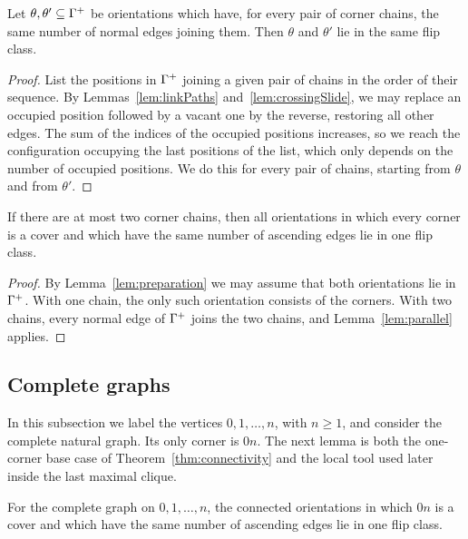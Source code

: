 \begin{lemma}\label{lem:parallel}
Let $\theta,\theta'\subseteq\Gamma^{+}$ be orientations which have, for every pair
of corner chains, the same number of normal edges joining them.
Then $\theta$ and $\theta'$ lie in the same flip class.
\end{lemma}

\begin{proof}
List the positions in $\Gamma^{+}$ joining a given pair of chains in the order of
their sequence.
By Lemmas~\ref{lem:linkPaths} and~\ref{lem:crossingSlide}, we may replace an occupied
position followed by a vacant one by the reverse, restoring all other edges.
The sum of the indices of the occupied positions increases, so we reach the
configuration occupying the last positions of the list, which only depends on
the number of occupied positions.
We do this for every pair of chains, starting from $\theta$ and from $\theta'$.
\end{proof}

\begin{lemma}\label{lem:twoChains}
If there are at most two corner chains, then all orientations in which every
corner is a cover and which have the same number of ascending edges lie in one
flip class.
\end{lemma}

\begin{proof}
By Lemma~\ref{lem:preparation} we may assume that both orientations lie in
$\Gamma^{+}$.
With one chain, the only such orientation consists of the corners.
With two chains, every normal edge of $\Gamma^{+}$ joins the two chains, and
Lemma~\ref{lem:parallel} applies.
\end{proof}

\subsection{Complete graphs}\label{subs:complete}

In this subsection we label the vertices $0,1,\dotsc,n$, with $n\geq1$, and
consider the complete natural graph.
Its only corner is $0n$.
The next lemma is both the one-corner base case of
Theorem~\ref{thm:connectivity} and the local tool used later inside the last
maximal clique.

\begin{lemma}\label{lem:complete}
For the complete graph on $0,1,\dotsc,n$, the connected orientations in which
$0n$ is a cover and which have the same number of ascending edges lie in one
flip class.
\end{lemma}

